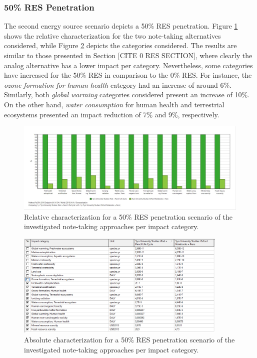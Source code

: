 \subsubsection{50\% RES Penetration}

The second energy source scenario depicts a 50\% RES penetration. Figure \ref*{fig:characterization_RES_50} shows the relative characterization for the two note-taking alternatives considered, while Figure \ref{fig:characterization_table_RES_50} depicts the categories considered. The results are similar to those presented in Section [CITE 0 RES SECTION], where clearly the analog alternative has a lower impact per category. Nevertheless, some categories have increased for the 50\% RES in comparison to the 0\% RES. For instance, the \textit{ozone formation for human health} category had an increase of around 6\%. Similarly, both \textit{global warming} categories considered present an increase of 10\%. On the other hand, \textit{water consumption} for human health and terrestrial ecosystems presented an impact reduction of 7\% and 9\%, respectively. 

\begin{figure}[H]
    \centering
    \includegraphics[width=\textwidth]{images/RES_50/Characterization_RES_50.JPG}
    \caption{Relative characterization for a 50\% RES penetration scenario of the investigated note-taking approaches per impact category.}\label{fig:characterization_RES_50}
\end{figure}

\begin{figure}[H]
    \centering
    \includegraphics[width=0.9\textwidth]{images/RES_50/Characterization_Table_RES_50.PNG}
    \caption{Absolute characterization for a 50\% RES penetration scenario of the investigated note-taking approaches per impact category.}\label{fig:characterization_table_RES_50}
\end{figure}

